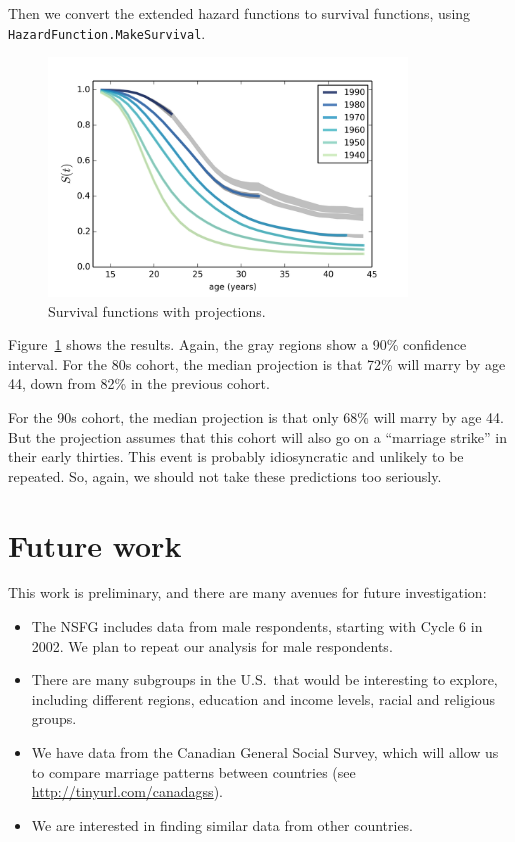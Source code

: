 \documentclass[journal]{IEEEtran}
\begin{document}
Then we convert the extended hazard functions to survival functions,
using {\tt HazardFunction.MakeSurvival}.

\begin{figure}[!t]
\centering
\includegraphics[width=3.75in]{marriage3}
\caption{Survival functions with projections.}
\label{fig:marriage3}
\end{figure}

Figure~\ref{fig:marriage3} shows the results.  Again,
the gray regions show a 90\% confidence interval.  For
the 80s cohort, the median projection is that 72\% will marry by
age 44, down from 82\% in the previous cohort.

For the 90s cohort, the median projection is that only 68\% will
marry by age 44.  But the projection assumes that this cohort will
also go on a ``marriage strike'' in their early thirties.
This event is probably
idiosyncratic and unlikely to be repeated.  So, again, we should
not take these predictions too seriously.


\section{Future work}

This work is preliminary, and there are many avenues for future
investigation:

\begin{itemize}

\item The NSFG includes data from male respondents, starting with Cycle 6
in 2002.  We plan to repeat our analysis for male respondents.

\item There are many subgroups in the U.S.\ that would be
interesting to explore, including different regions, education
and income levels, racial and religious groups. 

\item We have data from the Canadian General Social Survey,
which will allow us to compare marriage patterns between countries
(see \url{http://tinyurl.com/canadagss}).

\item We are interested in finding similar data from other countries.

\end{itemize}
\end{document}

